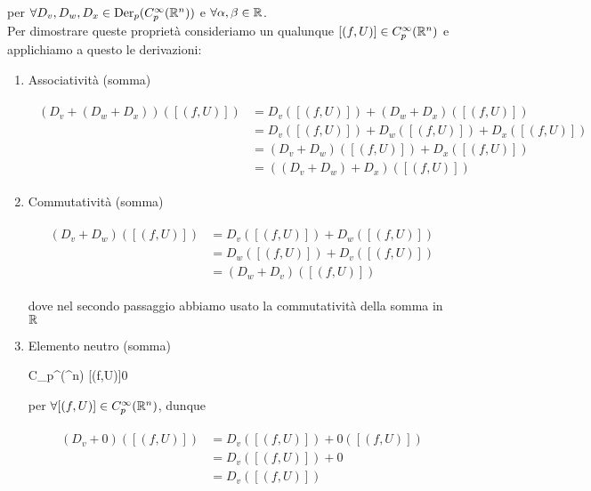 per $ \forall D_{v}, D_{w}, D_{x} \in \operatorname{Der}_{p}(C_{p}^{\infty}(\mathbb{R}^{n})) $ e $ \forall \alpha, \beta \in \mathbb{R} $.\\
Per dimostrare queste proprietà consideriamo un qualunque $ [(f,U)] \in C_{p}^{\infty}(\mathbb{R}^{n}) $ e applichiamo a questo le derivazioni:

\begin{enumerate}
	\item Associatività (somma)
	
	\begin{align}
		\begin{split}
			( D_{v} + (D_{w} + D_{x}) ) ([(f,U)]) &= D_{v} ([(f,U)]) + (D_{w} + D_{x}) ([(f,U)])\\
			&= D_{v} ([(f,U)]) + D_{w} ([(f,U)]) + D_{x} ([(f,U)])\\
			&= (D_{v} + D_{w}) ([(f,U)]) + D_{x} ([(f,U)])\\
			&= ( (D_{v} + D_{w}) + D_{x} ) ([(f,U)])
		\end{split}
	\end{align}
	
	\item Commutatività (somma)
	
	\begin{align}
		\begin{split}
			(D_{v} + D_{w}) ([(f,U)]) &= D_{v} ([(f,U)]) + D_{w} ([(f,U)])\\
			&= D_{w} ([(f,U)]) + D_{v} ([(f,U)])\\
			&= (D_{w} + D_{v}) ([(f,U)])
		\end{split}
	\end{align}
	
	dove nel secondo passaggio abbiamo usato la commutatività della somma in $ \mathbb{R} $
	
	\item Elemento neutro (somma)
	
		{C_{p}^{\infty}(\R^{n})}{\R}
		{[(f,U)]}{0}
	
	per $ \forall [(f,U)] \in C_{p}^{\infty}(\mathbb{R}^{n}) $, dunque
	
	\begin{align}
		\begin{split}
			(D_{v} + 0) ([(f,U)]) &= D_{v} ([(f,U)]) + 0 ([(f,U)])\\
			&= D_{v} ([(f,U)]) + 0\\
			&= D_{v} ([(f,U)])
		\end{split}
	\end{align}
	

\end{enumerate}
